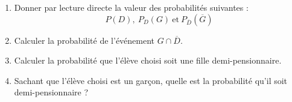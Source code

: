 \begin{exo}
	\begin{enumerate}[resume]
		\item Donner par lecture directe la valeur des probabilités suivantes :
		      \[
			      P(D),\ P_{D}(G)\ \text{et}\ P_{\overline{D}}(\overline{G})
		      \]

		\item Calculer la probabilité de l'événement $G \cap \overline{D}$.
		\item Calculer la probabilité que l'élève choisi soit une fille demi-pensionnaire.
		\item Sachant que l'élève choisi est un garçon, quelle est la probabilité qu'il soit demi-pensionnaire ?
	\end{enumerate}
\end{exo}
